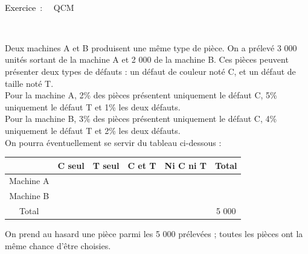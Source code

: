 \documentclass[11pt,a4paper]{article}
\newcounter{numexos}%
\newcommand{\exercice}[1]{%
\addtocounter{numexos}{1}%
\textcolor{black}{\normalsize Exercice\,\thenumexos\,}\,#1%
}
\newcommand{\bex}[2]
{\begin{bclogo}[couleur = white,logo= , barre=none,  arrondi = 0.1]
{~\exercice:~~{#1}}
~~
{#2}
~~
\end{bclogo}}
\begin{document}
 \bex{QCM}
 {
 \vspace{2mm}
 Deux machines A et B produisent une même type de pièce. On a prélevé 3 000 unités sortant de la machine A et 2 000 de la machine B. Ces pièces peuvent présenter deux types de défauts : un défaut de couleur noté C, et un défaut de taille noté T.\\
Pour la machine A, 2\% des pièces présentent uniquement le défaut C, 5\% uniquement le défaut T et 1\% les deux défauts.\\
Pour la machine B, 3\% des pièces présentent uniquement le défaut C, 4\% uniquement le défaut T et 2\% les deux défauts.\\
On pourra éventuellement se servir du tableau ci-dessous : \\[5 pt]
 

\begin{center}
\begin{tabular} { | c | c | c | c | c | c | }
   \hline
 \rowcolor{white}      & C seul & T seul & C et T & Ni C ni T & Total \\
   \hline 
 \rowcolor{white}   Machine A  & ~~ & ~~ & ~~ & ~~& ~~\\
   \hline
\rowcolor{white}    Machine B  & ~~ & ~~ & ~~& ~~& ~~\\
   \hline
\rowcolor{white}    Total  & ~~ & ~~ & ~~& ~~ & 5 000  \\
   \hline
 \end{tabular}
 \end{center}
 \vspace{4mm}
 
 On prend au hasard une pièce parmi les 5 000 prélevées ; toutes les pièces ont la même chance d'être choisies. 
}
\end{document}

